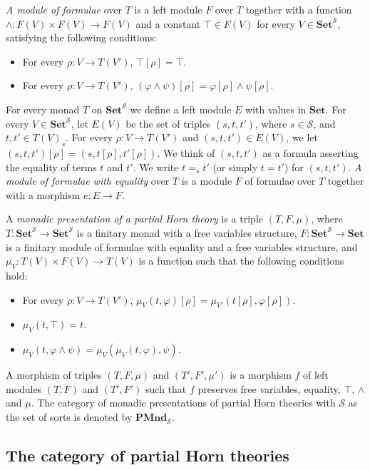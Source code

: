 \documentclass[reqno]{amsart}
\theoremstyle{definition}
\theoremstyle{remark}
\newcommand{\cat}[1]{\mathbf{#1}}
\newcommand{\Set}{\cat{Set}}
\newcommand{\PMnd}{\cat{PMnd}}
\numberwithin{figure}{section}
\begin{document}
\emph{A module of formulae} over $T$ is a left module $F$ over $T$ together with a function
    $\land : F(V) \times F(V) \to F(V)$ and a constant $\top \in F(V)$ for every $V \in \Set^\mathcal{S}$, satisfying the following conditions:
\begin{itemize}
\item For every $\rho : V \to T(V')$, $\top[\rho] = \top$.
\item For every $\rho : V \to T(V')$, $(\varphi \land \psi)[\rho] = \varphi[\rho] \land \psi[\rho]$.
\end{itemize}

For every monad $T$ on $\Set^\mathcal{S}$ we define a left module $E$ with values in $\Set$.
For every $V \in \Set^\mathcal{S}$, let $E(V)$ be the set of triples $(s,t,t')$, where $s \in \mathcal{S}$, and $t,t' \in T(V)_s$.
For every $\rho : V \to T(V')$ and $(s,t,t') \in E(V)$, we let $(s,t,t')[\rho] = (s,t[\rho],t'[\rho])$.
We think of $(s,t,t')$ as a formula asserting the equality of terms $t$ and $t'$.
We write $t =_s t'$ (or simply $t = t'$) for $(s,t,t')$.
\emph{A module of formulae with equality} over $T$ is a module $F$ of formulae over $T$ together with a morphism $e : E \to F$.

\begin{defn}
A \emph{monadic presentation of a partial Horn theory} is a triple $(T,F,\mu)$, where
    $T : \Set^\mathcal{S} \to \Set^\mathcal{S}$ is a finitary monad with a free variables structure,
    $F : \Set^\mathcal{S} \to \Set$ is a finitary module of formulae with equality and a free variables structure, and
    $\mu_V : T(V) \times F(V) \to T(V)$ is a function such that the following conditions hold:
\begin{itemize}
\item For every $\rho : V \to T(V')$, $\mu_V(t,\varphi)[\rho] = \mu_{V'}(t[\rho],\varphi[\rho])$.
\item $\mu_V(t, \top) = t$.
\item $\mu_V(t, \varphi \land \psi) = \mu_V(\mu_V(t, \varphi), \psi)$.
\end{itemize}
A morphism of triples $(T,F,\mu)$ and $(T',F',\mu')$ is a morphism $f$ of left modules $(T,F)$ and $(T',F')$ such that $f$ preserves free variables, equality, $\top$, $\land$ and $\mu$.
The category of monadic presentations of partial Horn theories with $\mathcal{S}$ as the set of sorts is denoted by $\PMnd_\mathcal{S}$.
\end{defn}

\subsection{The category of partial Horn theories}
\end{document}

